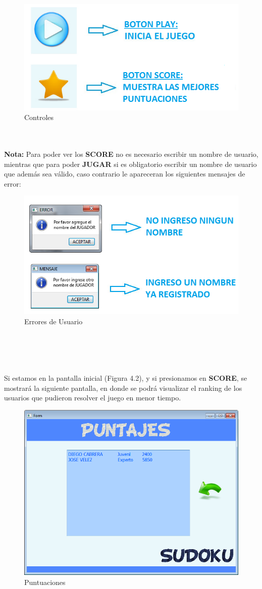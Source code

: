 \begin{figure}[htbp]
\begin{center}
\includegraphics[width=.60\textwidth]{./imagenes/Controles.png}
\caption{Controles}
\label{Controles}
\end{center}
\end{figure} 

\ \\ \ \\
\textbf{Nota:} Para poder ver los \textbf{SCORE} no es necesario escribir un nombre de usuario, mientras que para poder \textbf{JUGAR} si es obligatorio escribir un nombre de usuario que además sea v\'alido, caso contrario le apareceran los siguientes mensajes de error:

\begin{figure}[htbp]
\begin{center}
\includegraphics[width=.60\textwidth]{./imagenes/ErrorNoJugador.png}
\caption{Errores de Usuario}
\label{Errores de Usuario}
\end{center}
\end{figure} 

\ \\ \ \\ \ \\ \ \\
Si estamos en la pantalla inicial (Figura 4.2), y si presionamos en \textbf{SCORE}, se mostrará la siguiente pantalla, en donde se podrá visualizar el ranking de los usuarios que pudieron resolver el juego en menor tiempo. 
 
\begin{figure}[htbp]
\begin{center}
\includegraphics[width=.40\textwidth]{./imagenes/Puntajes3.png}
\caption{Puntuaciones}
\label{Puntuaciones}
\end{center}
\end{figure} 

